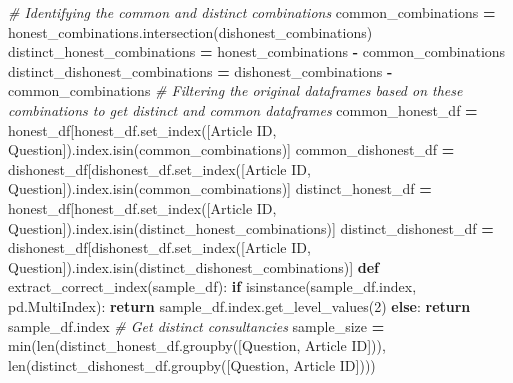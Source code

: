 \documentclass[
]{article}
\newenvironment{Shaded}{\begin{snugshade}}{\end{snugshade}}
\newcommand{\BuiltInTok}[1]{#1}
\newcommand{\CommentTok}[1]{\textcolor[rgb]{0.56,0.35,0.01}{\textit{#1}}}
\newcommand{\ControlFlowTok}[1]{\textcolor[rgb]{0.13,0.29,0.53}{\textbf{#1}}}
\newcommand{\DecValTok}[1]{\textcolor[rgb]{0.00,0.00,0.81}{#1}}
\newcommand{\KeywordTok}[1]{\textcolor[rgb]{0.13,0.29,0.53}{\textbf{#1}}}
\newcommand{\NormalTok}[1]{#1}
\newcommand{\OperatorTok}[1]{\textcolor[rgb]{0.81,0.36,0.00}{\textbf{#1}}}
\newcommand{\StringTok}[1]{\textcolor[rgb]{0.31,0.60,0.02}{#1}}
\begin{document}
\begin{Shaded}
\begin{Highlighting}[]
    \CommentTok{\# Identifying the common and distinct combinations}
\NormalTok{    common\_combinations }\OperatorTok{=}\NormalTok{ honest\_combinations.intersection(dishonest\_combinations)}
\NormalTok{    distinct\_honest\_combinations }\OperatorTok{=}\NormalTok{ honest\_combinations }\OperatorTok{{-}}\NormalTok{ common\_combinations}
\NormalTok{    distinct\_dishonest\_combinations }\OperatorTok{=}\NormalTok{ dishonest\_combinations }\OperatorTok{{-}}\NormalTok{ common\_combinations}
    \CommentTok{\# Filtering the original dataframes based on these combinations to get distinct and common dataframes}
\NormalTok{    common\_honest\_df }\OperatorTok{=}\NormalTok{ honest\_df[honest\_df.set\_index([}\StringTok{\textquotesingle{}Article ID\textquotesingle{}}\NormalTok{, }\StringTok{\textquotesingle{}Question\textquotesingle{}}\NormalTok{]).index.isin(common\_combinations)]}
\NormalTok{    common\_dishonest\_df }\OperatorTok{=}\NormalTok{ dishonest\_df[dishonest\_df.set\_index([}\StringTok{\textquotesingle{}Article ID\textquotesingle{}}\NormalTok{, }\StringTok{\textquotesingle{}Question\textquotesingle{}}\NormalTok{]).index.isin(common\_combinations)]}
\NormalTok{    distinct\_honest\_df }\OperatorTok{=}\NormalTok{ honest\_df[honest\_df.set\_index([}\StringTok{\textquotesingle{}Article ID\textquotesingle{}}\NormalTok{, }\StringTok{\textquotesingle{}Question\textquotesingle{}}\NormalTok{]).index.isin(distinct\_honest\_combinations)]}
\NormalTok{    distinct\_dishonest\_df }\OperatorTok{=}\NormalTok{ dishonest\_df[dishonest\_df.set\_index([}\StringTok{\textquotesingle{}Article ID\textquotesingle{}}\NormalTok{, }\StringTok{\textquotesingle{}Question\textquotesingle{}}\NormalTok{]).index.isin(distinct\_dishonest\_combinations)]}
    \KeywordTok{def}\NormalTok{ extract\_correct\_index(sample\_df):}
        \ControlFlowTok{if} \BuiltInTok{isinstance}\NormalTok{(sample\_df.index, pd.MultiIndex):}
            \ControlFlowTok{return}\NormalTok{ sample\_df.index.get\_level\_values(}\DecValTok{2}\NormalTok{)}
        \ControlFlowTok{else}\NormalTok{:}
            \ControlFlowTok{return}\NormalTok{ sample\_df.index}
    \CommentTok{\# Get distinct consultancies}
\NormalTok{    sample\_size }\OperatorTok{=} \BuiltInTok{min}\NormalTok{(}\BuiltInTok{len}\NormalTok{(distinct\_honest\_df.groupby([}\StringTok{\textquotesingle{}Question\textquotesingle{}}\NormalTok{, }\StringTok{\textquotesingle{}Article ID\textquotesingle{}}\NormalTok{])), }\BuiltInTok{len}\NormalTok{(distinct\_dishonest\_df.groupby([}\StringTok{\textquotesingle{}Question\textquotesingle{}}\NormalTok{, }\StringTok{\textquotesingle{}Article ID\textquotesingle{}}\NormalTok{])))}

\end{Highlighting}
\end{Shaded}
\end{document}
